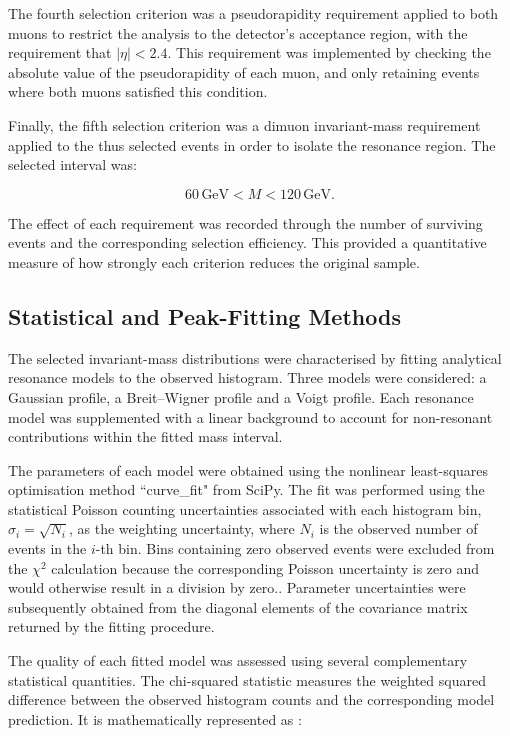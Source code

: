 \documentclass[11pt, a4paper]{article}
\numberwithin{equation}{section}
\begin{document}
The fourth selection criterion was a pseudorapidity requirement applied to both muons to restrict the analysis to the detector's acceptance region, with the requirement that $|\eta| < 2.4$. This requirement was implemented by checking the absolute value of the pseudorapidity of each muon, and only retaining events where both muons satisfied this condition.

Finally, the fifth selection criterion was a dimuon invariant-mass requirement applied to the thus selected events in order to isolate the resonance region. The selected interval was:

\begin{equation} 60 \, \text{GeV} < M < 120 \, \text{GeV}. \end{equation}

The effect of each requirement was recorded through the number of surviving events and the corresponding selection efficiency. This provided a quantitative measure of how strongly each criterion reduces the original sample.

\subsection{Statistical and Peak-Fitting Methods}

The selected invariant-mass distributions were characterised by fitting analytical resonance models to the observed histogram. Three models were considered: a Gaussian profile, a Breit--Wigner profile and a Voigt profile. Each resonance model was supplemented with a linear background to account for non-resonant contributions within the fitted mass interval.

The parameters of each model were obtained using the nonlinear least-squares optimisation method ``curve\_fit" from SciPy. The fit was performed using the statistical Poisson counting uncertainties associated with each histogram bin, $\sigma_i=\sqrt{N_i}$, as the weighting uncertainty, where $N_i$ is the observed number of events in the $i$-th bin. Bins containing zero observed events were excluded from the $\chi^2$ calculation because the corresponding Poisson uncertainty is zero and would otherwise result in a division by zero.. Parameter uncertainties were subsequently obtained from the diagonal elements of the covariance matrix returned by the fitting procedure.

The quality of each fitted model was assessed using several complementary statistical quantities. The chi-squared statistic measures the weighted squared difference between the observed histogram counts and the corresponding model prediction. It is mathematically represented as \cite{squires2001statistics}:
\end{document}
